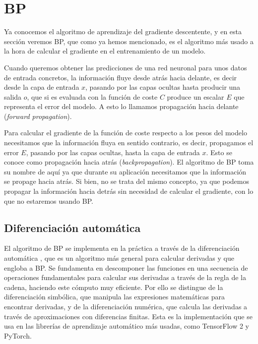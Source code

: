 \section{BP}
Ya conocemos el algoritmo de aprendizaje del gradiente descentente, y en esta sección veremos BP, que como ya hemos mencionado, es el algoritmo más usado a la hora de calcular el gradiente en el entrenamiento de un modelo. 

Cuando queremos obtener las predicciones de una red neuronal para unos datos de entrada concretos, la información fluye desde atrás hacia delante, es decir desde la capa de entrada $x$, pasando por las capas ocultas hasta producir una salida $o$, que si es evaluada con la función de coste $C$ produce un escalar $E$ que representa el error del modelo. A esto lo llamamos propagación hacia delante (\textit{forward propagation}).

Para calcular el gradiente de la función de coste respecto a los pesos del modelo necesitamos que la información fluya en sentido contrario, es decir, propagamos el error $E$, pasando por las capas ocultas, hasta la capa de entrada $x$. Esto se conoce como propagación hacia atrás (\textit{backpropagation}). El algoritmo de BP toma su nombre de aquí ya que durante su aplicación necesitamos que la información se propage hacia atrás. Si bien, no se trata del mismo concepto, ya que podemos propagar la información hacia detrás sin necesidad de calcular el gradiente, con lo que no estaremos usando BP.






\subsection{Diferenciación automática}

El algoritmo de BP se implementa en la práctica a través de la diferenciación automática \cite{AutomaticDiff}, que es un algoritmo más general para calcular derivadas y que engloba a BP. Se fundamenta en descomponer las funciones en una secuencia de operaciones fundamentales para calcular sus derivadas a través de la regla de la cadena, haciendo este cómputo muy eficiente. Por ello se distingue de la diferenciación simbólica, que manipula las expresiones matemáticas para encontrar derivadas, y de la diferenciación numérica, que calcula las derivadas a través de aproximaciones con diferencias finitas. Esta es la implementación que se usa en las librerías de aprendizaje automático más usadas, como TensorFlow 2 y PyTorch.

